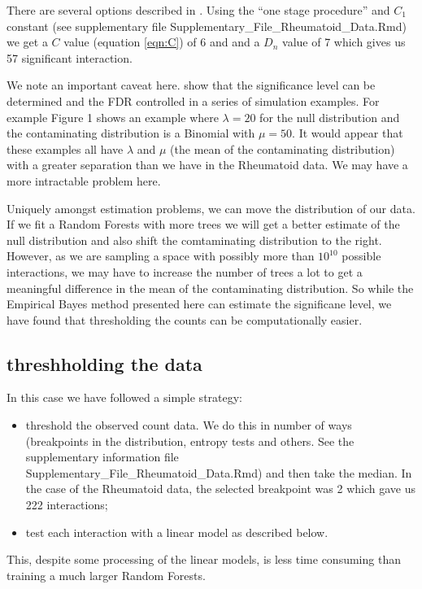 \documentclass[preprint,12pt,3p]{elsarticle}
\begin{document}
There are several options described in  \cite{Gauran.et.al.2018}.
Using the ``one stage procedure'' and $C_1$ constant (see supplementary file Supplementary\_File\_Rheumatoid\_Data.Rmd)
we get a $C$ value (equation \ref{eqn:C}) of 6 and and a $D_n$ value of 7 which gives us 57 significant interaction.

We note an important caveat here.  \cite{Gauran.et.al.2018} show that the significance level can be
determined and the FDR controlled in a series of simulation examples. For example  Figure 1 \cite[]{Gauran.et.al.2018}
shows an example where $\lambda =20$ for the null distribution and the contaminating distribution is a Binomial with
$\mu=50.$ It would appear that these examples all have $\lambda$ and $\mu$ (the mean of the contaminating distribution) with a
greater separation than we have in the Rheumatoid data. We may have a more intractable problem here.

Uniquely amongst estimation problems, we can move the distribution of our data. If we fit a Random Forests with more
trees we will get a better estimate of the null distribution and also shift the comtaminating distribution to the
right. However, as we are sampling a space with possibly more than $10^{10}$ possible interactions, we may have to increase the
number of trees a lot to get a meaningful difference in the mean of the contaminating distribution.
So while the Empirical Bayes method presented here can estimate the significane level, we have found that
thresholding the counts can be computationally easier. 

\subsection{threshholding the data}
In this case we have followed a simple strategy:
\begin{itemize}
\item threshold the observed count data. We do this in number of ways  (breakpoints in the distribution,
  entropy tests and others. See the supplementary information file Supplementary\_File\_Rheumatoid\_Data.Rmd) and then take the median. In
  the case of the Rheumatoid data, the selected breakpoint was 2 which gave us 222 interactions;
\item test each interaction with a linear model as described below.
\end{itemize}

This, despite some processing of the linear models, is less time consuming than training a much larger Random Forests.
\end{document}
